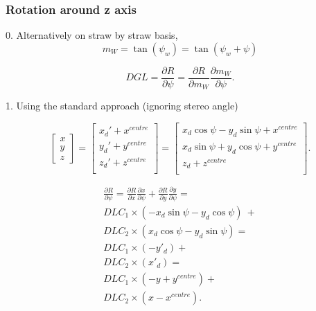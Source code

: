 \documentclass[a4paper,11pt]{article}
\begin{document}
\subsubsection{Rotation around z axis}

0. Alternatively on straw by straw basis,
\begin{equation}
m_W = \tan (\psi_w) =  \tan (\psi_w + \psi)
\end{equation}

\begin{equation}
DGL = \frac{ \partial R}{\partial \psi} = \frac{ \partial R}{\partial m_W} \frac{ \partial m_W}{\partial \psi}.
\end{equation}

1. Using the standard approach (ignoring stereo angle)

\begin{equation}
\begin{bmatrix}x\\y\\z\end{bmatrix}=\begin{bmatrix}x_d'+x^{centre}\\ y_d' + y^{centre} \\z_d'+z^{centre}\\\end{bmatrix}=\begin{bmatrix}x_d\cos \psi - y_d\sin \psi + x^{centre} \\ x_d \sin \psi + y_d \cos \psi + y^{centre} \\ z_d + z^{centre} \\\end{bmatrix}. \label{eq:global}
\end{equation}

\begin{equation}
\begin{split}
\frac{\partial R}{\partial\psi} = \frac{\partial R}{\partial x}\frac{\partial x}{\partial \psi} + \frac{\partial R}{\partial y}\frac{\partial y}{\partial \psi} = \\ DLC_1 \times (-x_d\sin \psi - y_d\cos \psi) \ + \\ DLC_2 \times (x_d\cos \psi - y_d\sin \psi) = \\
DLC_1 \times (-y'_d) + \\ DLC_2 \times (x'_d) = \\
DLC_1 \times (-y + y^{centre}) + \\ DLC_2 \times (x - x^{centre}).
\end{split}
\end{equation}
\end{document}
